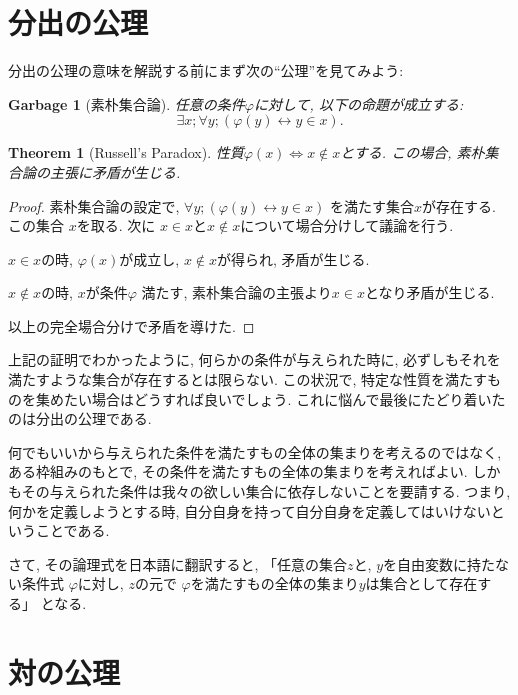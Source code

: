 \documentclass[lualatex]{ltjsbook}
\newtheorem{theorem}{Theorem}[chapter]
\theoremstyle{remark}
\theoremstyle{plain}
\newtheorem*{garbage}{Garbage}
\begin{document}
\section{分出の公理}

分出の公理の意味を解説する前にまず次の“公理”を見てみよう:

\begin{garbage}[素朴集合論]
	任意の条件$\varphi$に対して, 以下の命題が成立する:
	 \[
	\exists x; \forall y;\left( \varphi(y) \leftrightarrow y \in x \right) 
	.\] 
\end{garbage}

\begin{theorem}[Russell's Paradox]
	性質$\varphi (x) \iff x \not\in x  $とする. この場合, 素朴集合論の主張に矛盾が生じる.
\end{theorem}

\begin{proof}
	素朴集合論の設定で, $\forall y; \left(  \varphi (y) \leftrightarrow y \in x \right) $ を満たす集合$x$が存在する. この集合 $x$を取る. 次に $x \in x$と$x \not\in x$について場合分けして議論を行う.

	$x \in x$の時, $\varphi(x) $が成立し,  $x \not\in x$が得られ, 矛盾が生じる.


	$x \not\in x$の時,  $x$が条件$\varphi$ 満たす, 素朴集合論の主張より$x \in x$となり矛盾が生じる.


	以上の完全場合分けで矛盾を導けた.
\end{proof}

上記の証明でわかったように, 何らかの条件が与えられた時に, 必ずしもそれを満たすような集合が存在するとは限らない. この状況で, 特定な性質を満たすものを集めたい場合はどうすれば良いでしょう. これに悩んで最後にたどり着いたのは分出の公理である. 


何でもいいから与えられた条件を満たすもの全体の集まりを考えるのではなく, ある枠組みのもとで, その条件を満たすもの全体の集まりを考えればよい. しかもその与えられた条件は我々の欲しい集合に依存しないことを要請する. つまり, 何かを定義しようとする時, 自分自身を持って自分自身を定義してはいけないということである.


さて, その論理式を日本語に翻訳すると, 「任意の集合$z$と, $y$を自由変数に持たない条件式 $\varphi$に対し,  $z$の元で $\varphi$を満たすもの全体の集まり$y$は集合として存在する」 となる. 

\section{対の公理}
\end{document}
